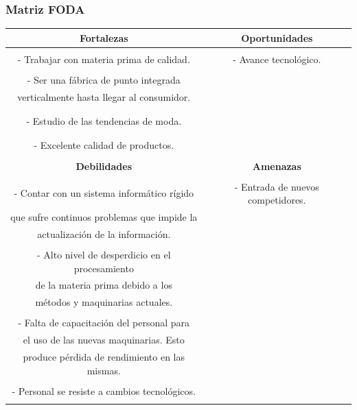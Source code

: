 \documentclass[a4paper,10pt,titlepage]{article}
\begin{document}
\subsubsection{Matriz FODA}
	\vspace*{0.5cm}
	\begin{tabular}{|c|c|}
	\hline 
	\textbf{Fortalezas} & \textbf{Oportunidades} \\ \hline & \\
- Trabajar con materia prima de calidad. & - Avance tecnol\'{o}gico.\\ &\\
- Ser una f\'{a}brica de punto integrada & \\verticalmente hasta llegar al consumidor. &\\ &\\ & \\
- Estudio de las tendencias de moda. & \\& \\ & \\
- Excelente calidad de productos.& \\& \\

	\hline
	\textbf{Debilidades} & \textbf{Amenazas} \\
	\hline &\\
- Contar con un sistema inform\'{a}tico r\'{i}gido& - Entrada de nuevos competidores. \\que sufre continuos problemas que impide la &\\ actualizaci\'{o}n de la informaci\'{o}n. &\\ &\\
- Alto nivel de desperdicio en el procesamiento &\\ de la materia prima debido a los &\\ m\'{e}todos y maquinarias actuales. &\\ &\\
- Falta de capacitaci\'{o}n del personal para &\\el uso de las nuevas maquinarias. Esto &\\ produce p\'{e}rdida de rendimiento en las mismas. &\\ &\\
- Personal se resiste a cambios tecnol\'{o}gicos. &\\ &\\
	\hline    
	\end{tabular}
\end{document}
